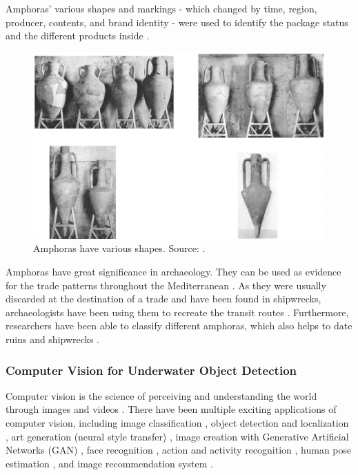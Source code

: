 \documentclass[a4paper,11pt,oneside]{article}
\begin{document}
  Amphoras' various shapes and markings - which changed by time, region, producer, contents, and brand
  identity - were used to identify the package status and the different products inside \cite{twede2002commercial}.

  \begin{figure}[ht]
    \begin{center}
      \includegraphics[width=.8\textwidth]{amphora_various_shape.png}
    \end{center}
    \caption{Amphoras have various shapes. Source: \cite{twede2002commercial}.}
  \end{figure}

  Amphoras have great significance in archaeology. They can be used as evidence for the trade patterns throughout
  the Mediterranean \cite{twede2002commercial}. As they were usually discarded at the destination of a trade and have been
  found in shipwrecks, archaeologists have been using them to recreate the transit routes \cite{twede2002commercial}.
  Furthermore, researchers have been able to classify different amphoras, which also helps to date ruins and shipwrecks
  \cite{twede2002commercial}.

  \subsubsection{Computer Vision for Underwater Object Detection}

  Computer vision is the science of perceiving and understanding the world through images and videos \cite{elgendy2020deep}.
  There have been multiple exciting applications of computer vision, including image classification \cite{rawat2017deep},
  object detection and localization \cite{zhao2019object,liu2020deep}, art generation (neural style transfer)
  \cite{jing2019neural}, image creation with Generative Artificial Networks (GAN) \cite{goodfellow2014generative},
  face recognition \cite{parkhi2015deep}, action and activity recognition \cite{poppe2010survey}, human pose estimation
  \cite{toshev2014deeppose}, and image recommendation system \cite{niu2018neural}.
\end{document}
